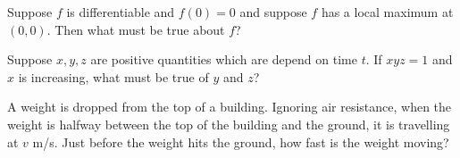 \documentclass{ximera}
\newcommand{\recommendation}[1]{}
\begin{document}
\begin{shuffle}
\begin{problem}
  Suppose $f$ is differentiable and $f(0) = 0$ and suppose $f$ has a
  local maximum at $(0,0)$.  Then what must be true about $f$?
  \begin{multipleChoice}
  \end{multipleChoice}
\end{problem}


\begin{problem}
  Suppose $x, y, z$ are positive quantities which are depend on time
  $t$.  If $xyz = 1$ and $x$ is increasing, what must be true of $y$ and $z$?
  \begin{multipleChoice}
  \end{multipleChoice}
\end{problem}



\begin{problem}
  A weight is dropped from the top of a building.  Ignoring air
  resistance, when the weight is halfway between the top of the
  building and the ground, it is travelling at $v$ m/s.  Just before
  the weight hits the ground, how fast is the weight moving?
  \begin{multipleChoice}
  \end{multipleChoice}
\end{problem}




\end{shuffle}
\end{document}
